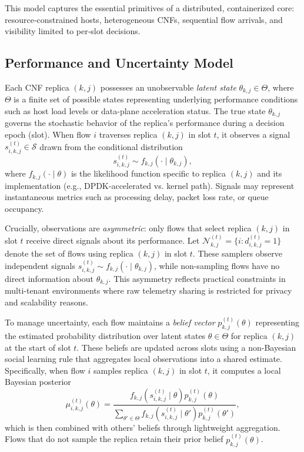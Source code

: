 \documentclass[journal]{IEEEtran}
\theoremstyle{plain}
\theoremstyle{definition}
\theoremstyle{remark}
\begin{document}
This model captures the essential primitives of a distributed, containerized core: resource‑constrained hosts, heterogeneous CNFs, sequential flow arrivals, and visibility limited to per‑slot decisions.

\subsection{Performance and Uncertainty Model}
\label{sec:sys_performance}

Each CNF replica $(k,j)$ possesses an unobservable \emph{latent state} $\theta_{k,j} \in \Theta$, where $\Theta$ is a finite set of possible states representing underlying performance conditions such as host load levels or data-plane acceleration status. The true state $\theta_{k,j}$ governs the stochastic behavior of the replica's performance during a decision epoch (slot). When flow $i$ traverses replica $(k,j)$ in slot $t$, it observes a signal $s_{i,k,j}^{(t)} \in \mathcal{S}$ drawn from the conditional distribution
\begin{equation}
s_{i,k,j}^{(t)} \sim f_{k,j}(\cdot \mid \theta_{k,j}),
\label{eq:signal_model}
\end{equation}
where $f_{k,j}(\cdot \mid \theta)$ is the likelihood function specific to replica $(k,j)$ and its implementation (e.g., DPDK-accelerated vs. kernel path). Signals may represent instantaneous metrics such as processing delay, packet loss rate, or queue occupancy.

Crucially, observations are \emph{asymmetric}: only flows that select replica $(k,j)$ in slot $t$ receive direct signals about its performance. Let $\mathcal{N}_{k,j}^{(t)} = \{i : d_{i,k,j}^{(t)} = 1\}$ denote the set of flows using replica $(k,j)$ in slot $t$. These samplers observe independent signals $s_{i,k,j}^{(t)} \sim f_{k,j}(\cdot \mid \theta_{k,j})$, while non-sampling flows have no direct information about $\theta_{k,j}$. This asymmetry reflects practical constraints in multi-tenant environments where raw telemetry sharing is restricted for privacy and scalability reasons.

To manage uncertainty, each flow maintains a \emph{belief vector} $p_{k,j}^{(t)}(\theta)$ representing the estimated probability distribution over latent states $\theta \in \Theta$ for replica $(k,j)$ at the start of slot $t$. These beliefs are updated across slots using a non-Bayesian social learning rule that aggregates local observations into a shared estimate. Specifically, when flow $i$ samples replica $(k,j)$ in slot $t$, it computes a local Bayesian posterior
\begin{equation}
\mu_{i,k,j}^{(t)}(\theta) = \frac{f_{k,j}(s_{i,k,j}^{(t)} \mid \theta) p_{k,j}^{(t)}(\theta)}{\sum_{\theta' \in \Theta} f_{k,j}(s_{i,k,j}^{(t)} \mid \theta') p_{k,j}^{(t)}(\theta')},
\label{eq:local_posterior}
\end{equation}
which is then combined with others' beliefs through lightweight aggregation. Flows that do not sample the replica retain their prior belief $p_{k,j}^{(t)}(\theta)$.
\end{document}
